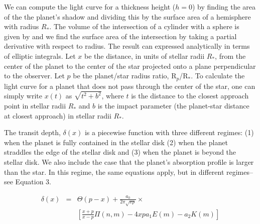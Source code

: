 \documentclass[manuscript]{aastex}
\newcommand{\p}{R$_p$/R$_*$}
\begin{document}
We can compute the light curve for a thickness height ($h=0$) by finding the area of the the planet's shadow and dividing this by the surface area of a hemisphere with radius $R_*$. The volume of the intersection of a cylinder with a sphere is given by \citet{lamarche} and we find the surface area of the intersection by taking a partial derivative with respect to radius. The result can expressed analytically in terms of elliptic integrals.
Let $x$ be the distance, in units of stellar radii $R_*$, from the center of the planet to the center of the star projected onto a plane perpendicular to the observer. Let $p$ be the planet/star radius ratio, \p. To calculate the light curve for a planet that does not pass through the center of the star, one can simply write $x(t)$ as $\sqrt{t^2+b^2}$, where $t$ is the distance to the closest approach point in stellar radii $R_*$ and $b$ is the impact parameter (the planet-star distance at closest approach) in stellar radii $R_*$. 

The transit depth, $\delta (x)$ is a piecewise function with three different regimes: (1) when the planet is fully contained in the stellar disk (2) when the planet straddles the edge of the stellar disk and (3) when the planet is beyond the stellar disk. We also include the case that the planet's absorption profile is larger than the star. In this regime, the same equations apply, but in different regimes--see Equation 3.

\begin{eqnarray}\label{disk}
\delta(x)&=& \Theta (p-x)+\frac{a_0}{2 \pi \sqrt{xp}} \times \\
&&\left[\frac{x+p}{x-p} \Pi(n,m) - 4 x p a_1 E(m) - a_2 K(m) \right] \nonumber
\end{eqnarray}

\end{document}

